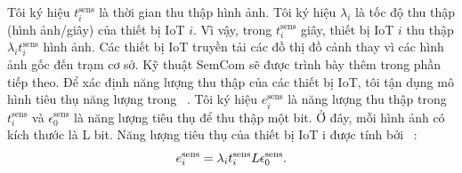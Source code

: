 \documentclass{article} %
\begin{document}
Tôi ký hiệu $t_i^{\mathrm{sens}}$ là thời gian thu thập hình ảnh. Tôi ký hiệu $\lambda_i$ là tốc độ thu thập (hình ảnh/giây) của thiết bị IoT $i$. Vì vậy, trong $t_i^{\mathrm{sens}}$ giây, thiết bị IoT $i$ thu thập $\lambda_it_i^{\mathrm{sens}}$ hình ảnh. Các thiết bị IoT truyền tải các đồ thị đồ cảnh thay vì các hình ảnh gốc đến trạm cơ sở. Kỹ thuật SemCom sẽ được trình bày thêm trong phần tiếp theo.
Để xác định năng lượng thu thập của các thiết bị IoT, tôi tận dụng mô hình tiêu thụ năng lượng trong  ~\cite{thammawichai2017optimizing}. Tôi ký hiệu $e_i^{\mathrm{sens}}$ là năng lượng thu thập trong $t_i^{\mathrm{sens}}$ và $\epsilon_0^{\mathrm{sens}}$ là năng lượng tiêu thụ để thu thập một bit. Ở đây, mỗi hình ảnh có kích thước là L bit. Năng lượng tiêu thụ của thiết bị IoT i được tính bởi  ~\cite{thammawichai2017optimizing}:
\begin{equation}
e^{\rm{sens}}_i =  \lambda_i t^{\rm{sens}}_i L \epsilon^{\rm{sens}}_0.
\end{equation}
\end{document}
